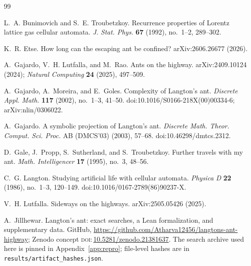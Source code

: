 \documentclass[11pt,reqno]{amsart}
\theoremstyle{plain}
\theoremstyle{definition}
\begin{document}
\begin{thebibliography}{99}

L.~A. Bunimovich and S.~E. Troubetzkoy.
\newblock Recurrence properties of {L}orentz lattice gas cellular automata.
\newblock \emph{J. Stat. Phys.} \textbf{67} (1992), no.~1--2, 289--302.

K.~R. Etse.
\newblock How long can the escaping ant be confined?
\newblock arXiv:2606.26677 (2026).

A.~Gajardo, V.~H. Lutfalla, and M.~Rao.
\newblock Ants on the highway.
\newblock arXiv:2409.10124 (2024); \emph{Natural Computing} \textbf{24} (2025), 497--509.

A.~Gajardo, A.~Moreira, and E.~Goles.
\newblock Complexity of {L}angton's ant.
\newblock \emph{Discrete Appl. Math.} \textbf{117} (2002), no.~1--3, 41--50.
\newblock doi:10.1016/S0166-218X(00)00334-6; arXiv:nlin/0306022.

A.~Gajardo.
\newblock A symbolic projection of {L}angton's ant.
\newblock \emph{Discrete Math. Theor. Comput. Sci. Proc.} AB (DMCS'03)
  (2003), 57--68.
\newblock doi:10.46298/dmtcs.2312.

D.~Gale, J.~Propp, S.~Sutherland, and S.~Troubetzkoy.
\newblock Further travels with my ant.
\newblock \emph{Math. Intelligencer} \textbf{17} (1995), no.~3, 48--56.

C.~G. Langton.
\newblock Studying artificial life with cellular automata.
\newblock \emph{Physica D} \textbf{22} (1986), no.~1--3, 120--149.
\newblock doi:10.1016/0167-2789(86)90237-X.

V.~H. Lutfalla.
\newblock Sideways on the highways.
\newblock arXiv:2505.05426 (2025).

A.~Jillhewar.
\newblock Langton's ant: exact searches, a Lean formalization, and supplementary data.
\newblock GitHub, \url{https://github.com/Atharva12456/langtons-ant-highway}; Zenodo
concept \textsc{doi}:\,\href{https://doi.org/10.5281/zenodo.21381637}{10.5281/zenodo.21381637}.
The search archive used here is pinned in Appendix~\ref{app:repro}; file-level hashes
are in \texttt{results/artifact\_hashes.json}.

\end{thebibliography}
\end{document}
